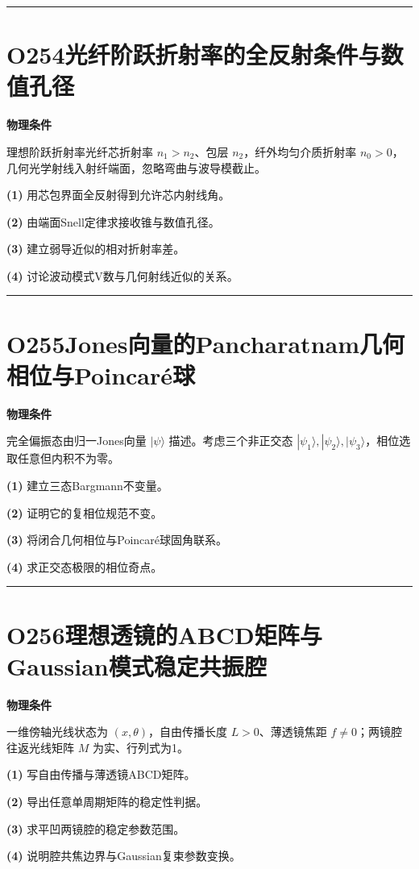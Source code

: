 \documentclass[UTF8,a4paper,11pt,oneside,openany]{ctexbook}
\begin{document}
\par\bigskip\hrule\bigskip
\section*{O254\quad 光纤阶跃折射率的全反射条件与数值孔径}
\textbf{物理条件}\par 理想阶跃折射率光纤芯折射率 \(n_1>n_2\)、包层 \(n_2\)，纤外均匀介质折射率 \(n_0>0\)，几何光学射线入射纤端面，忽略弯曲与波导模截止。
\par\noindent\textbf{(1)} 用芯包界面全反射得到允许芯内射线角。
\par\noindent\textbf{(2)} 由端面Snell定律求接收锥与数值孔径。
\par\noindent\textbf{(3)} 建立弱导近似的相对折射率差。
\par\noindent\textbf{(4)} 讨论波动模式V数与几何射线近似的关系。

\par\bigskip\hrule\bigskip
\section*{O255\quad Jones向量的Pancharatnam几何相位与Poincaré球}
\textbf{物理条件}\par 完全偏振态由归一Jones向量 \(|\psi\rangle\) 描述。考虑三个非正交态 \(|\psi_1\rangle,|\psi_2\rangle,|\psi_3\rangle\)，相位选取任意但内积不为零。
\par\noindent\textbf{(1)} 建立三态Bargmann不变量。
\par\noindent\textbf{(2)} 证明它的复相位规范不变。
\par\noindent\textbf{(3)} 将闭合几何相位与Poincaré球固角联系。
\par\noindent\textbf{(4)} 求正交态极限的相位奇点。

\par\bigskip\hrule\bigskip
\section*{O256\quad 理想透镜的ABCD矩阵与Gaussian模式稳定共振腔}
\textbf{物理条件}\par 一维傍轴光线状态为 \((x,\theta)\)，自由传播长度 \(L>0\)、薄透镜焦距 \(f\ne0\)；两镜腔往返光线矩阵 \(M\) 为实、行列式为1。
\par\noindent\textbf{(1)} 写自由传播与薄透镜ABCD矩阵。
\par\noindent\textbf{(2)} 导出任意单周期矩阵的稳定性判据。
\par\noindent\textbf{(3)} 求平凹两镜腔的稳定参数范围。
\par\noindent\textbf{(4)} 说明腔共焦边界与Gaussian复束参数变换。
\end{document}
